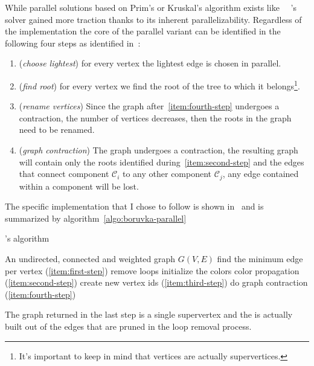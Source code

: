 \documentclass[a4paper,10pt]{article}
\begin{document}
While parallel solutions based on Prim's or Kruskal's algorithm exists like~\cite{prim-parallel}~\cite{filter-kruskal} \brka's solver gained more traction thanks to its inherent parallelizability. Regardless of the implementation the core of the parallel variant can be identified in the following four steps as identified in~\cite{boruvka-steps}:
\begin{enumerate}
	\item\label{item:first-step} (\textit{choose lightest}) for every vertex the lightest edge is chosen in parallel.
	\item\label{item:second-step} (\textit{find root}) for every vertex we find the root of the tree to which it belongs\footnote{It's important to keep in mind that vertices are actually supervertices.}.
	\item\label{item:third-step} (\textit{rename vertices}) Since the graph after~\ref{item:fourth-step} undergoes a contraction, the number of vertices decreases, then the roots in the graph need to be renamed.
	\item\label{item:fourth-step} (\textit{graph contraction}) The graph undergoes a contraction, the resulting graph will contain only the roots identified during~\ref{item:second-step} and the edges that connect component $\mathcal{C}_i$ to any other component $\mathcal{C}_j$, any edge contained within a component will be lost.
\end{enumerate}

The specific implementation that I chose to follow is shown in~\cite{generic-he-boruvka} and is summarized by algorithm~\ref{algo:boruvka-parallel}

\begin{algorithm}
	\caption{\brka's algorithm}\label{algo:boruvka-parallel}
	\begin{algorithmic}[1]
		\REQUIRE An undirected, connected and weighted graph $G(V, E)$
		\STATE find the minimum edge per vertex (\ref{item:first-step})
		\STATE remove loops
		\STATE initialize the colors
		\STATE color propagation (\ref{item:second-step})
		\ENDWHILE
		\STATE create new vertex ids (\ref{item:third-step})
		\STATE do graph contraction (\ref{item:fourth-step})
		\ENDWHILE
	\end{algorithmic}
\end{algorithm}

The graph returned in the last step is a single supervertex and the \mst is actually built out of the edges that are pruned in the loop removal process.
\end{document}
